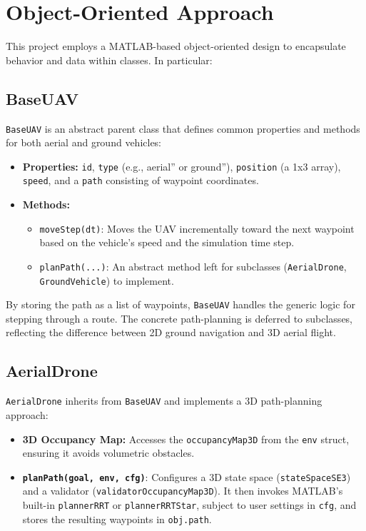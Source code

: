 \documentclass[12pt,a4paper]{report}
\begin{document}
\section{Object-Oriented Approach}
\label{sec:obj_approach}
This project employs a MATLAB-based object-oriented design to encapsulate behavior and data within 
classes. In particular:

\subsection{BaseUAV}
\label{sec:baseuav}
\texttt{BaseUAV} is an abstract parent class that defines common properties and methods for 
both aerial and ground vehicles:

\begin{itemize}
    \item \textbf{Properties:} 
          \texttt{id}, \texttt{type} (e.g., aerial'' or ground''), 
          \texttt{position} (a 1x3 array), \texttt{speed}, and a \texttt{path} 
          consisting of waypoint coordinates.
    \item \textbf{Methods:}
        \begin{itemize}
            \item \texttt{moveStep(dt)}: Moves the UAV incrementally toward the next waypoint 
                  based on the vehicle's speed and the simulation time step.
            \item \texttt{planPath(...)}: An abstract method left for subclasses 
                  (\texttt{AerialDrone}, \texttt{GroundVehicle}) to implement.
        \end{itemize}
\end{itemize}

By storing the path as a list of waypoints, \texttt{BaseUAV} handles the generic logic for 
stepping through a route. The concrete path-planning is deferred to subclasses, reflecting 
the difference between 2D ground navigation and 3D aerial flight.

\subsection{AerialDrone}
\label{sec:aerial_drone}
\texttt{AerialDrone} inherits from \texttt{BaseUAV} and implements a 3D path-planning approach:

\begin{itemize}
    \item \textbf{3D Occupancy Map:} 
          Accesses the \texttt{occupancyMap3D} from the \texttt{env} struct, ensuring 
          it avoids volumetric obstacles.
    \item \textbf{\texttt{planPath(goal, env, cfg)}}: 
          Configures a 3D state space (\texttt{stateSpaceSE3}) and a validator 
          (\texttt{validatorOccupancyMap3D}). It then invokes MATLAB’s built-in 
          \texttt{plannerRRT} or \texttt{plannerRRTStar}, subject to user settings in 
          \texttt{cfg}, and stores the resulting waypoints in \texttt{obj.path}.
\end{itemize}
\end{document}
